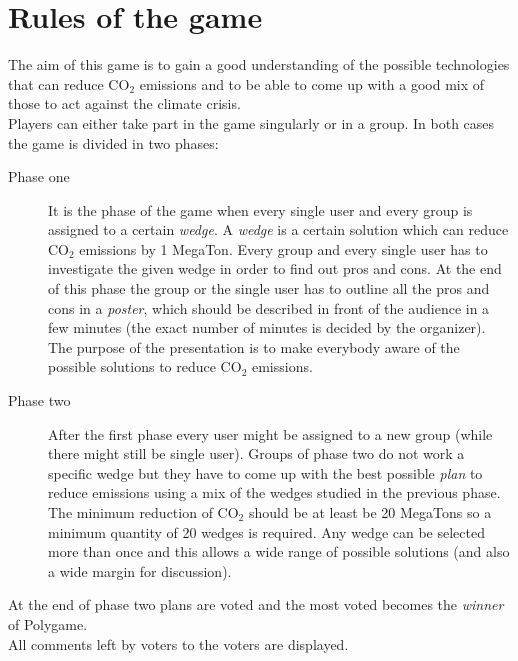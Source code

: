 \section{Rules of the game}
\label{rules}
The aim of this game is to gain a good understanding of the possible technologies that can reduce CO$_{2}$ emissions and to be able to come up with a good mix of those to act against the climate crisis.\\

Players can either take part in the game singularly or in a group. In both cases the game is divided in two phases:
	\begin{description}
		\item[Phase one] It is the phase of the game when every single user and every group is assigned to a certain \emph{wedge}. A \emph{wedge} is a certain solution which can reduce CO$_{2}$ emissions by 1 MegaTon. Every group and every single user has to investigate the given wedge in order to find out pros and cons. At the end of this phase the group or the single user has to outline all the pros and cons in a \emph{poster}, which should be described in front of the audience in a few minutes (the exact number of minutes is decided by the organizer). The purpose of the presentation is to make everybody aware of the possible solutions to reduce CO$_{2}$ emissions.
		\item[Phase two] After the first phase every user might be assigned to a new group (while there might still be single user). Groups of phase two do not work a specific wedge but they have to come up with the best possible \emph{plan} to reduce emissions using a mix of the wedges studied in the previous phase. The minimum reduction of CO$_{2}$ should be at least be 20 MegaTons so a minimum quantity of 20 wedges is required. Any wedge can be selected more than once and this allows a wide range of possible solutions (and also a wide margin for discussion).
	\end{description}
	
	 At the end of phase two plans are voted and the most voted becomes the \emph{winner} of Polygame.\\
All comments left by voters to the voters are displayed.
